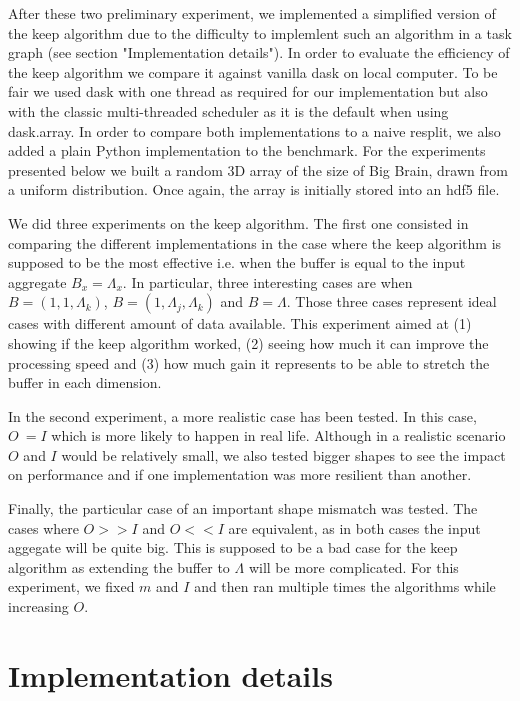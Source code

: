 \documentclass[conference]{IEEEtran}
\begin{document}
After these two preliminary experiment, we implemented a simplified version of
the keep algorithm due to the difficulty to implemlent such an algorithm in a
task graph (see section "Implementation details"). In order to evaluate the
efficiency of the keep algorithm we compare it against vanilla dask on local
computer. To be fair we used dask with one thread as required for our
implementation but also with the classic multi-threaded  scheduler as it is the
default when using dask.array. In order to compare both implementations to a
naive resplit, we also added a plain Python implementation to the benchmark. For
the experiments presented below we built a random 3D array of the size of Big
Brain, drawn from a uniform distribution. Once again, the array is initially
stored into an hdf5 file.

We did three experiments on the keep algorithm. The first one consisted in
comparing the different implementations in the case where the keep algorithm is
supposed to be the most effective i.e. when the buffer is equal to the input
aggregate $B_x=\Lambda_x$. In particular, three interesting cases are when
$B=(1,1,\Lambda_k)$, $B=(1,\Lambda_j, \Lambda_k)$ and $B=\Lambda$. Those three
cases represent ideal cases with different amount of data available. This
experiment aimed at (1) showing if the keep algorithm worked, (2) seeing how much it
can improve the processing speed and (3) how much gain it represents to be able to
stretch the buffer in each dimension.

In the second experiment, a more realistic case has been tested. In this case,
$O~=I$ which is more likely to happen in real life. Although in a realistic
scenario $O$ and $I$ would be relatively small, we also tested bigger shapes to
see the impact on performance and if one implementation was more resilient than
another.

Finally, the particular case of an important shape mismatch was tested. The cases
where $O>>I$ and $O<<I$ are equivalent, as in both cases the input aggegate
will be quite big. This is supposed to be a bad case for the keep algorithm
as extending the buffer to $\Lambda$ will be more complicated. For this
experiment, we fixed $m$ and $I$ and then ran multiple times the algorithms
while increasing $O$.

\section{Implementation details}
\end{document}
